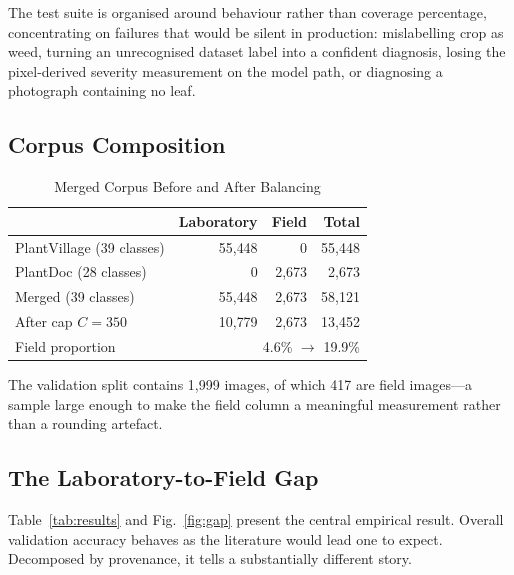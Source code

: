 \documentclass[conference]{IEEEtran}
\begin{document}
The test suite is organised around behaviour rather than coverage percentage,
concentrating on failures that would be silent in production: mislabelling crop
as weed, turning an unrecognised dataset label into a confident diagnosis,
losing the pixel-derived severity measurement on the model path, or diagnosing
a photograph containing no leaf.

\subsection{Corpus Composition}

\begin{table}[!t]
\caption{Merged Corpus Before and After Balancing}
\label{tab:corpus}
\centering
\footnotesize
\begin{tabular}{@{}lrrr@{}}
\toprule
 & Laboratory & Field & Total \\
\midrule
PlantVillage (39 classes) & 55{,}448 & 0 & 55{,}448 \\
PlantDoc (28 classes)     & 0 & 2{,}673 & 2{,}673 \\
Merged (39 classes)       & 55{,}448 & 2{,}673 & 58{,}121 \\
\midrule
After cap $C{=}350$       & 10{,}779 & 2{,}673 & 13{,}452 \\
Field proportion          & \multicolumn{3}{r}{4.6\% $\rightarrow$ 19.9\%} \\
\bottomrule
\end{tabular}
\end{table}

The validation split contains 1{,}999 images, of which 417 are field images---a
sample large enough to make the field column a meaningful measurement rather
than a rounding artefact.

\subsection{The Laboratory-to-Field Gap}

Table~\ref{tab:results} and Fig.~\ref{fig:gap} present the central empirical
result. Overall validation accuracy behaves as the literature would lead one to
expect. Decomposed by provenance, it tells a substantially different story.
\end{document}
